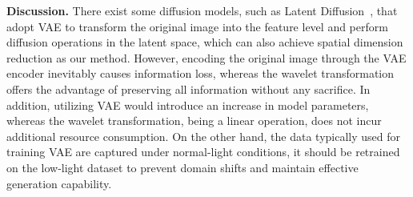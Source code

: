 {\textbf{Discussion.} There exist some diffusion models, such as Latent Diffusion~\cite{latent_diffusion}, that adopt VAE to transform the original image into the feature level and perform diffusion operations in the latent space, which can also achieve spatial dimension reduction as our method. However, encoding the original image through the VAE encoder inevitably causes information loss, whereas the wavelet transformation offers the advantage of preserving all information without any sacrifice. In addition, utilizing VAE would introduce an increase in model parameters, whereas the wavelet transformation, being a linear operation, does not incur additional resource consumption. On the other hand, the data typically used for training VAE are captured under normal-light conditions, it should be retrained on the low-light dataset to prevent domain shifts and maintain effective generation capability.}

